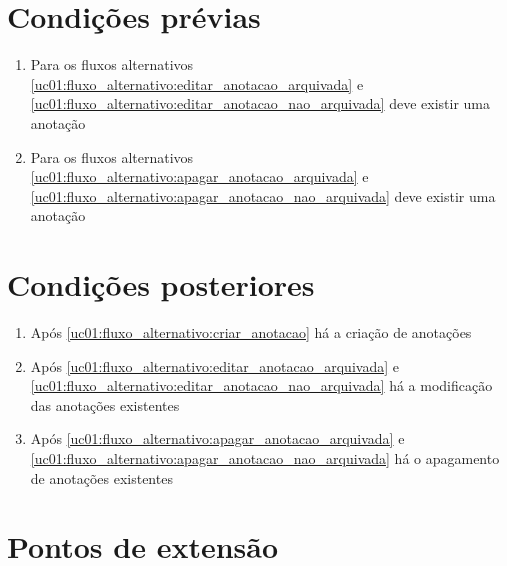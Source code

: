\documentclass[
	12pt,				%
	oneside,			%
	a4paper,			%
	english,			%
	brazil,				%
	]{abntex2}
\begin{document}
\section{Condições prévias}
    \begin{enumerate}
        \item Para os fluxos alternativos \ref{uc01:fluxo_alternativo:editar_anotacao_arquivada} e \ref{uc01:fluxo_alternativo:editar_anotacao_nao_arquivada} deve existir uma anotação
        \item Para os fluxos alternativos \ref{uc01:fluxo_alternativo:apagar_anotacao_arquivada} e \ref{uc01:fluxo_alternativo:apagar_anotacao_nao_arquivada} deve existir uma anotação
    \end{enumerate}

\section{Condições posteriores}
\begin{enumerate}
    \item Após \ref{uc01:fluxo_alternativo:criar_anotacao} há a criação de anotações
    \item Após \ref{uc01:fluxo_alternativo:editar_anotacao_arquivada} e \ref{uc01:fluxo_alternativo:editar_anotacao_nao_arquivada} há a modificação das anotações existentes
    \item Após \ref{uc01:fluxo_alternativo:apagar_anotacao_arquivada} e \ref{uc01:fluxo_alternativo:apagar_anotacao_nao_arquivada} há o apagamento de anotações existentes
\end{enumerate}

\section{Pontos de extensão}
\end{document}

